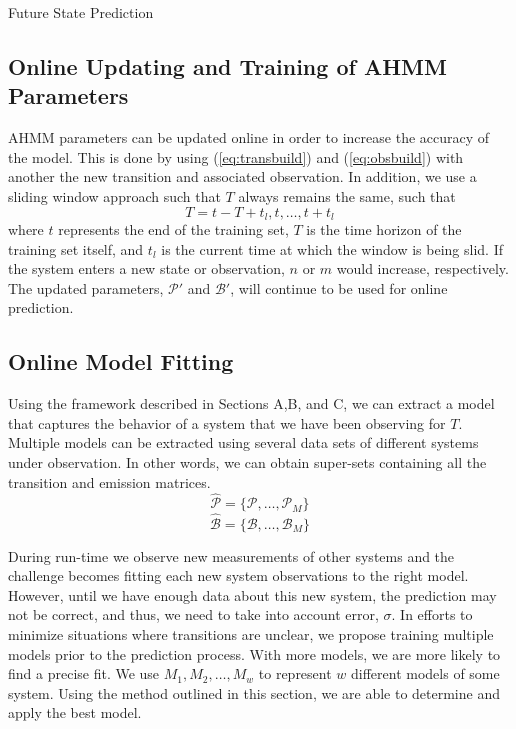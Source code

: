 \documentclass[conference]{IEEEtran}
\begin{document}
\begin{algorithm}[H]
\SetAlgoLined
{}
 \caption{Future State Prediction}
\end{algorithm}


\subsection{Online Updating and Training of AHMM Parameters}
AHMM parameters can be updated online in order to increase the accuracy of the model. This is done by using (\ref{eq:transbuild}) and (\ref{eq:obsbuild}) with another the new transition and associated observation. In addition, we use a sliding window approach such that $T$ always remains the same, such that
\begin{equation}
 T = t-T+t_l,t,\ldots,t+t_l    
\end{equation}
where $t$ represents the end of the training set, $T$ is the time horizon of the training set itself, and $t_l$ is the current time at which the window is being slid. If the system enters a new state or observation, $n$ or $m$ would increase, respectively. The updated parameters, $\mathcal{P'}$ and $\mathcal{B'}$, will continue to be used for online prediction.

\subsection{Online Model Fitting}
Using the framework described in Sections A,B, and C,  we can extract a model that captures the behavior of a system that we have been observing for $T$. Multiple models can be extracted using several data sets of different systems under observation. In other words, we can obtain super-sets containing all the transition and emission matrices.
\begin{equation}
    \hat{\mathcal{P}} = \{\mathcal{P},\ldots,\mathcal{P}_M\}
\end{equation}
\begin{equation}
    \hat{\mathcal{B}} = \{\mathcal{B},\ldots,\mathcal{B}_M\}
\end{equation}

During run-time we observe new measurements of other systems and the challenge becomes fitting each new system observations to the right model. However, until we have enough data about this new system, the prediction may not be correct, and thus, we need to take into account error, $\sigma$. In efforts to minimize situations where transitions are unclear, we propose training multiple models prior to the prediction process. With more models, we are more likely to find a precise fit. We use $M_1,M_2,\ldots,M_w$ to represent $w$ different models of some system. Using the method outlined in this section, we are able to determine and apply the best model.
\end{document}
